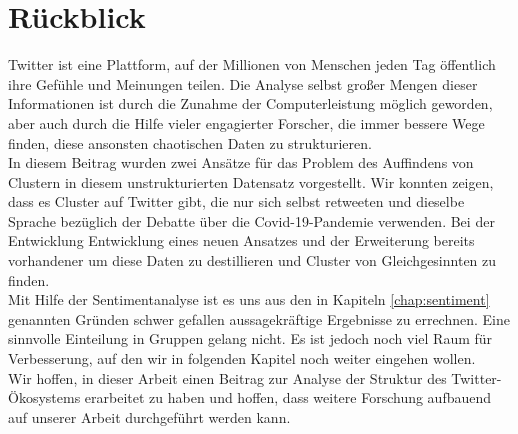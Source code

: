 \chapter{Rückblick}
\label{chap:ruckblick}
Twitter ist eine Plattform, auf der Millionen von Menschen jeden Tag öffentlich ihre Gefühle und Meinungen teilen. Die Analyse selbst großer Mengen dieser Informationen ist durch die Zunahme der Computerleistung möglich geworden, aber auch durch die Hilfe vieler engagierter Forscher, die immer bessere Wege finden, diese ansonsten chaotischen Daten zu strukturieren. \\ \newline
In diesem Beitrag wurden zwei Ansätze für das Problem des Auffindens von Clustern in diesem unstrukturierten Datensatz vorgestellt. Wir konnten zeigen, dass es Cluster auf Twitter gibt, die nur sich selbst retweeten und dieselbe Sprache bezüglich der Debatte über die Covid-19-Pandemie verwenden. Bei der Entwicklung Entwicklung eines neuen Ansatzes und der Erweiterung bereits vorhandener um diese Daten zu destillieren und Cluster von Gleichgesinnten zu finden. \\ \newline
Mit Hilfe der Sentimentanalyse ist es uns aus den in Kapiteln \ref{chap:sentiment}  genannten Gründen schwer gefallen aussagekräftige Ergebnisse zu errechnen. Eine sinnvolle Einteilung in Gruppen gelang nicht. Es ist jedoch noch viel Raum für Verbesserung, auf den wir in folgenden Kapitel noch weiter eingehen wollen. \\ \newline
Wir hoffen, in dieser Arbeit einen Beitrag zur Analyse der Struktur des Twitter-Ökosystems erarbeitet zu haben und hoffen, dass weitere Forschung aufbauend auf unserer Arbeit durchgeführt werden kann.

